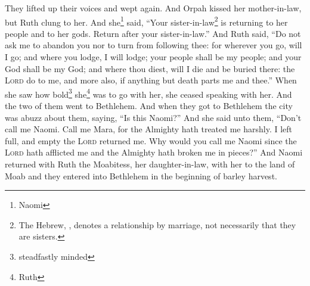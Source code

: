\begin{enumerate}[align=center]
     They lifted up their voices and wept again. And Orpah kissed her mother-in-law, but Ruth clung to her.%
     And she\footnote{Naomi} said, ``Your sister-in-law\footnote{The Hebrew, , denotes a relationship by marriage, not necessarily that they are sisters.} is returning to her people and to her gods. Return after your sister-in-law.''%
     And Ruth said, ``Do not ask me to abandon you nor to turn from following thee: for wherever you go, will I go; and where you lodge, I will lodge; your people shall be my people; and your God shall be my God;%
     and where thou diest, will I die and be buried there: the \textsc{Lord} do to me, and more also, if anything but death parts me and thee.''%
     When she saw how bold\footnote{steadfastly minded} she\footnote{Ruth} was to go with her, she ceased speaking with her.%
     And the two of them went to Bethlehem. And when they got to Bethlehem the city was abuzz about them, saying, ``Is this Naomi?''%
     And she said unto them, ``Don't call me Naomi. Call me Mara, for the Almighty hath treated me harshly.%
     I left full, and empty the \textsc{Lord} returned me. Why would you call me Naomi since the \textsc{Lord} hath afflicted me and the Almighty hath broken me in pieces?''%
     And Naomi returned with Ruth the Moabitess, her daughter-in-law, with her to the land of Moab and they entered into Bethlehem in the beginning of barley harvest.%
\end{enumerate}
